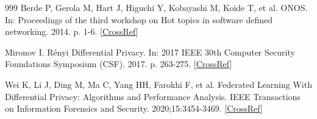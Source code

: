\documentclass[cmc,article,submit,moreauthors,pdftex]{Definitions/tsp}
\begin{document}
\begin{thebibliography}{999}
Berde P, Gerola M, Hart J, Higuchi Y, Kobayashi M, Koide T, et al. ONOS. In: Proceedings of the third workshop on Hot topics in software defined networking. 2014. p. 1-6. [\href{https://doi.org/10.1145/2620728.2620744}{CrossRef}]

Mironov I. Rényi Differential Privacy. In: 2017 IEEE 30th Computer Security Foundations Symposium (CSF). 2017. p. 263-275. [\href{https://doi.org/10.1109/csf.2017.11}{CrossRef}]

Wei K, Li J, Ding M, Ma C, Yang HH, Farokhi F, et al. Federated Learning With Differential Privacy: Algorithms and Performance Analysis. IEEE Transactions on Information Forensics and Security. 2020;15:3454-3469. [\href{https://doi.org/10.1109/tifs.2020.2988575}{CrossRef}]

\end{thebibliography}
\end{document}
